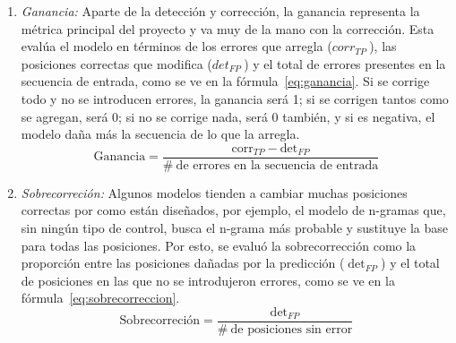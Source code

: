 \documentclass[sigconf,nonacm]{acmart}
\begin{document}
\begin{enumerate}
\item \emph{Ganancia:} Aparte de la detección y corrección, la ganancia representa la métrica principal del proyecto y va muy de la mano con la corrección. Esta evalúa el modelo en términos de los errores que arregla (\(corr_{TP}\ \)), las posiciones correctas que modifica (\(det_{FP}\ \)) y el total de errores presentes en la secuencia de entrada, como se ve en la fórmula~\eqref{eq:ganancia}. Si se corrige todo y no se introducen errores, la ganancia será 1; si se corrigen tantos como se agregan, será 0; si no se corrige nada, será 0 también, y si es negativa, el modelo daña más la secuencia de lo que la arregla.
\begin{equation}\label{eq:ganancia}
\mathrm{Ganancia} = \frac{\mathrm{corr}_{TP} - \mathrm{det}_{FP}}{\#\ \text{de errores en la secuencia de entrada}}
\end{equation}

\item \emph{Sobrecorreción:} Algunos modelos tienden a cambiar muchas posiciones correctas por como están diseñados, por ejemplo, el modelo de n-gramas que, sin ningún tipo de control, busca el n-grama más probable y sustituye la base para todas las posiciones. Por esto, se evaluó la sobrecorrección como la proporción entre las posiciones dañadas por la predicción (\(\det_{FP}\)) y el total de posiciones en las que no se introdujeron errores, como se ve en la fórmula~\eqref{eq:sobrecorreccion}.
\begin{equation}\label{eq:sobrecorreccion}
\text{Sobrecorreción} = \frac{\mathrm{det}_{FP}}{\#\ \text{de posiciones sin error}}
\end{equation}


\end{enumerate}
\end{document}
